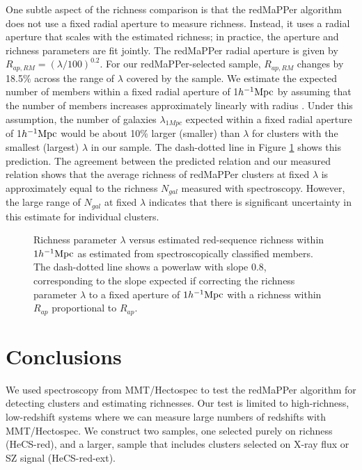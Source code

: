One subtle aspect of the richness comparison is that the redMaPPer
algorithm does not use a fixed radial aperture to measure richness.  Instead, it 
uses a radial aperture that scales with the estimated richness; 
in practice, the aperture and richness parameters are fit jointly.  The redMaPPer radial 
aperture is given by $R_{ap,RM} = (\lambda/100)^{0.2}$.  For our redMaPPer-selected 
sample, $R_{ap,RM}$ changes by 18.5\% across the range of $\lambda$ covered by the 
sample.  We estimate the expected number of members within a fixed radial aperture of 1$h^{-1}{\rm Mpc}$
by assuming that the number of members increases approximately linearly 
with radius \citep[consistent with an NFW number density profile, see also Figure 16 of ][]{rykoff14}.
Under this assumption, the number of 
galaxies $\lambda_{1Mpc}$ expected within a fixed radial aperture of 1$h^{-1}{\rm Mpc}$ would be about 10\% larger
(smaller) than $\lambda$ for clusters with the smallest (largest) $\lambda$ in our sample. 
The dash-dotted line in Figure \ref{specrich} shows this prediction.  The agreement between 
the predicted relation and our measured relation shows that the average richness of 
redMaPPer clusters at fixed $\lambda$ is approximately equal to the richness $N_{gal}$ measured 
with spectroscopy.  However, the large range of $N_{gal}$ at fixed $\lambda$ indicates that 
there is significant uncertainty in this estimate for individual clusters. 


\begin{figure} 
\caption{\label{specrich} Richness parameter $\lambda$ versus
estimated red-sequence richness within $1h^{-1}{\rm Mpc}$ as estimated from 
spectroscopically classified members.  
The dash-dotted line shows a powerlaw with slope 0.8, corresponding to the slope 
expected if correcting the richness parameter $\lambda$ to a fixed aperture of $1h^{-1}{\rm Mpc}$ 
with a richness within $R_{ap}$ proportional to $R_{ap}$.  
 }
\end{figure}




\section{Conclusions}

We used spectroscopy from MMT/Hectospec to test the redMaPPer algorithm 
for detecting clusters and estimating richnesses. Our test is limited to 
high-richness, low-redshift systems where we can measure large numbers of redshifts
with MMT/Hectospec. 
We construct two samples, one selected purely on richness (HeCS-red), and 
a larger, sample that includes clusters selected on X-ray flux or SZ signal (HeCS-red-ext). 

